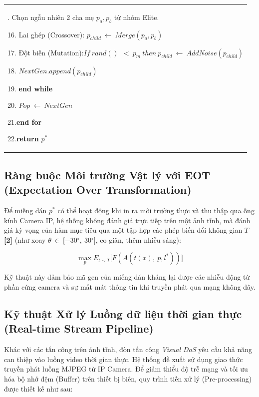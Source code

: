 \documentclass[a4paper,fleqn]{cas-dc}
\begin{document}
\begin{table}[t]
\begin{tabular}{@{}
  >{\raggedright\arraybackslash}p{}@{}}
15. Chọn ngẫu nhiên 2 cha mẹ \(p_{a}{,p}_{b}\) từ nhóm Elite.

16. Lai ghép (Crossover):
\(p_{child}\  \leftarrow \ Merge(p_{a}{,p}_{b})\)

17. Đột biến
(Mutation):\(If\ rand()\ \  < \ p_{m}\ then\ p_{child}\  \leftarrow \ AddNoise(p_{child})\)

18. \(NextGen.append(p_{child})\)

19. \textbf{end while}

20. \(Pop\  \leftarrow \ NextGen\)

21.\textbf{end for}

22.\textbf{return} \(p^{*}\) \\
\end{tabular}
\end{table}

\subsection{Ràng buộc Môi trường Vật lý với EOT (Expectation Over Transformation)}



Để miếng dán \(p^{*}\) có thể hoạt động khi in ra môi trường thực và thu
thập qua ống kính Camera IP, hệ thống không đánh giá trực tiếp trên một
ảnh tĩnh, mà đánh giá kỳ vọng của hàm mục tiêu qua một tập hợp các phép
biến đổi không gian \(T\) \textbf{{[}2{]}} (như xoay
\(\theta\  \in \ \lbrack - 30{^\circ},\ 30{^\circ}\rbrack\), co giãn,
thêm nhiễu sáng):

\[\max_{p}E_{t\sim T}\lbrack F(A(t(x),\ p,l^{*}))\rbrack\]

Kỹ thuật này đảm bảo mã gen của miếng dán kháng lại được các nhiễu động
từ phần cứng camera và sự mất mát thông tin khi truyền phát qua mạng
không dây.

\subsection{Kỹ thuật Xử lý Luồng dữ liệu thời gian thực (Real-time Stream Pipeline)}



Khác với các tấn công trên ảnh tĩnh, đòn tấn công \emph{Visual DoS} yêu
cầu khả năng can thiệp vào luồng video thời gian thực. Hệ thống đề xuất
sử dụng giao thức truyền phát luồng MJPEG từ IP Camera. Để giảm thiểu độ
trễ mạng và tối ưu hóa bộ nhớ đệm (Buffer) trên thiết bị biên, quy trình
tiền xử lý (Pre-processing) được thiết kế như sau:
\end{document}
